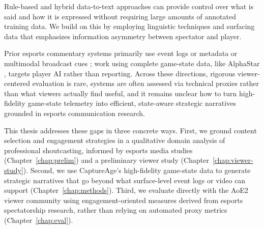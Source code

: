 Rule-based and hybrid data-to-text approaches can provide control over what is said and how it is expressed without requiring large amounts of annotated training data. We build on this by employing linguistic techniques and surfacing data that emphasizes information asymmetry between spectator and player.

Prior esports commentary systems primarily use event logs or metadata \cite{wang2021, wang2024, wang2025, barot2017, elarewaju2020, zhang2022} or multimodal broadcast cues \cite{zhang2024}; work using complete game-state data, like AlphaStar \cite{mathieu2023}, targets player AI rather than reporting. Across these directions, rigorous viewer-centered evaluation is rare, systems are often assessed via technical proxies rather than what viewers actually find useful, and it remains unclear how to turn high-fidelity game-state telemetry into efficient, state-aware strategic narratives grounded in esports communication research.

This thesis addresses these gaps in three concrete ways. First, we ground content selection and engagement strategies in a qualitative domain analysis of professional shoutcasting, informed by esports media studies (Chapter~\ref{chap:prelim}) and a preliminary viewer study (Chapter~\ref{chap:viewer-study}). Second, we use CaptureAge's high-fidelity game-state data to generate strategic narratives that go beyond what surface-level event logs or video can support (Chapter~\ref{chap:methods}). Third, we evaluate directly with the AoE2 viewer community using engagement-oriented measures derived from esports spectatorship research, rather than relying on automated proxy metrics (Chapter~\ref{chap:eval}).